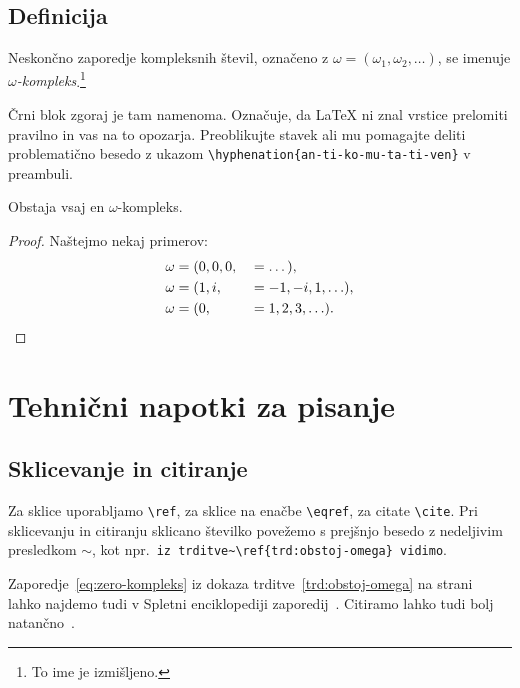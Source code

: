 \documentclass[isrm2, tisk]{fmfdelo}
\begin{document}
    \subsection{Definicija}
    \begin{definicija}
        Neskončno zaporedje kompleksnih števil, označeno z $\omega = (\omega_1, \omega_2, \ldots)$,
        se imenuje \emph{$\omega$-kompleks}.\footnote{To ime je izmišljeno.}

        Črni blok zgoraj je tam namenoma. Označuje, da \LaTeX{} ni znal vrstice prelomiti pravilno
        in vas na to opozarja. Preoblikujte stavek ali mu pomagajte deliti problematično besedo z
        ukazom \verb|\hyphenation{an-ti-ko-mu-ta-ti-ven}| v preambuli.
    \end{definicija}
    \begin{trditev}
        \label{trd:obstoj-omega}
        Obstaja vsaj en $\omega$-kompleks.
    \end{trditev}
    \begin{proof}
        Naštejmo nekaj primerov:
        \begin{align}
            \omega &= (0, 0, 0,& &= \dots), \label{eq:zero-kompleks} \\
            \omega &= (1, i, & &=-1, -i, 1, \ldots), \nonumber \\
            \omega &= (0,& &= 1, 2, 3, \ldots). \nonumber \qedhere  %
        \end{align}
    \end{proof}


    \section{Tehnični napotki za pisanje}

    \subsection{Sklicevanje in citiranje}
    Za sklice uporabljamo \verb|\ref|, za sklice na enačbe \verb|\eqref|, za citate \verb|\cite|. Pri
    sklicevanju in citiranju sklicano številko povežemo s prejšnjo besedo z nedeljivim presledkom
    $\sim$, kot npr.\ \verb|iz trditve~\ref{trd:obstoj-omega} vidimo|.

    \begin{primer}
        Zaporedje~\eqref{eq:zero-kompleks} iz dokaza trditve~\ref{trd:obstoj-omega} na
        strani~\pageref{trd:obstoj-omega} lahko najdemo tudi v Spletni enciklopediji zaporedij~\cite{oeis}.
        Citiramo lahko tudi bolj natančno~\cite[trditev 2.1, str.\ 23]{lebedev2009introduction}.
    \end{primer}
\end{document}
